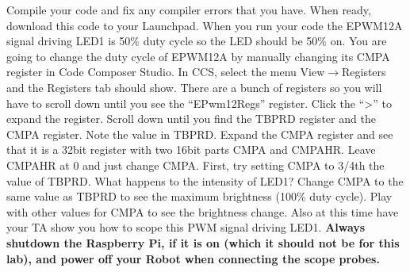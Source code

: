 \documentclass[11pt]{article}
\begin{document}
Compile your code and fix any compiler errors that you have. When ready, download this code to your Launchpad. When you run your code the EPWM12A signal driving LED1 is 50\% duty cycle so the LED should be 50\% on. You are going to change the duty cycle of EPWM12A by manually changing its CMPA register in Code Composer Studio. In CCS, select the menu View$\rightarrow$Registers and the Registers tab should show. There are a bunch of registers so you will have to scroll down until you see the “EPwm12Regs” register. Click the “\textgreater” to expand the register. Scroll down until you find the TBPRD register and the CMPA register. Note the value in TBPRD. Expand the CMPA register and see that it is a 32bit register with two 16bit parts CMPA and CMPAHR. Leave CMPAHR at 0 and just change CMPA. First, try setting CMPA to 3/4th the value of TBPRD. What happens to the intensity of LED1? Change CMPA to the same value as TBPRD to see the maximum brightness (100\% duty cycle). Play with other values for CMPA to see the brightness change. Also at this time have your TA show you how to scope this PWM signal driving LED1. \textbf{Always shutdown the Raspberry Pi, if it is on (which it should not be for this lab), and power off your Robot when connecting the scope probes.}
\end{document}
